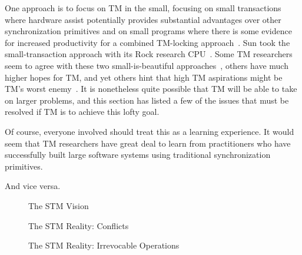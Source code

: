 One approach is to focus on TM in the small, focusing on small
transactions where hardware assist potentially provides substantial
advantages over other synchronization primitives and on small programs
where there is some evidence for increased productivity for a combined
TM-locking approach~\cite{VPankratius2011TMvsLockingProductivity}.
Sun took the small-transaction approach with its Rock research
CPU~\cite{DaveDice2009ASPLOSRockHTM}.
Some TM researchers seem to agree with these two small-is-beautiful
approaches~\cite{JMStone93}, others have much higher hopes for TM, and yet others
hint that high TM aspirations might be TM's worst
enemy~\cite[Section 6]{Attiya:2010:ICT:1835698.1835699}.
It is nonetheless quite possible that TM will be able to take on larger
problems, and this section has listed a few of the issues that must be
resolved if TM is to achieve this lofty goal.

Of course, everyone involved should treat this as a learning experience.
It would seem that TM researchers have great deal to learn from
practitioners who have successfully built large software systems using
traditional synchronization primitives.

And vice versa.

\QuickQuizEnd

\begin{figure}
\centering
{}
\caption{The STM Vision}
\end{figure}

\begin{figure}
\centering
{}
\caption{The STM Reality:
			  Conflicts}
\end{figure}

\begin{figure}
\centering
{}
\caption{The STM Reality:
			  Irrevocable Operations}
\end{figure}

